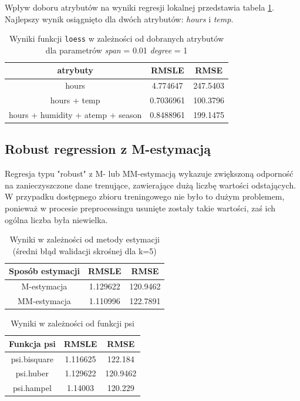 \documentclass[a4paper,12pt]{article}
\begin{document}
        Wpływ doboru atrybutów na wyniki regresji lokalnej przedstawia tabela \ref{tab:loessAttr}. Najlepszy wynik osiągnięto dla dwóch atrybutów: \textit{hours} i \textit{temp}.
        
        \begin{table}
            \begin{tabular}{|c|c|c|}
                \hline 
                atrybuty & RMSLE & RMSE \\ 
                \hline 
                hours & 4.774647 & 247.5403 \\ 
                \hline 
                hours + temp & 0.7036961 & 100.3796 \\ 
                \hline 
                hours + humidity + atemp + season & 0.8488961 & 199.1475 \\ 
                \hline 
            \end{tabular}
            \caption{Wyniki funkcji \texttt{loess} w zależności od dobranych atrybutów dla parametrów \textit{span} = 0.01 \textit{degree} = 1}
            \label{tab:loessAttr}
        \end{table}
        
   \subsection{Robust regression z M-estymacją}
   
   Regresja typu "robust" z M- lub MM-estymacją wykazuje zwiększoną odporność na zanieczyszczone dane trenujące, zawierające dużą liczbę wartości odstających. W przypadku 
   dostępnego zbioru treningowego nie było to dużym problemem, ponieważ w procesie preprocessingu usunięte zostały takie wartości, zaś ich ogólna liczba była niewielka.
   
    \begin{table}   
   \begin{tabular}{|c|c|c|}
   \hline
   Sposób estymacji & RMSLE & RMSE \\
   \hline
   M-estymacja & 1.129622 & 120.9462 \\
   \hline
   MM-estymacja & 1.110996 & 122.7891 \\
   \hline
   \end{tabular}
   \caption{Wyniki w zależności od metody estymacji (średni błąd walidacji skrośnej dla k=5)}
    \end{table}
    \begin{table}
            \begin{tabular}{|c|c|c|}
                \hline
                Funkcja psi & RMSLE & RMSE \\
                \hline
                psi.bisquare & 1.116625 & 122.184 \\
                \hline
                psi.huber & 1.129622 & 120.9462 \\
                \hline
                psi.hampel & 1.14003 & 120.229 \\
                \hline
            \end{tabular}
            \caption{Wyniki w zależności od funkcji psi}    
    \end{table}
    
\end{document}
